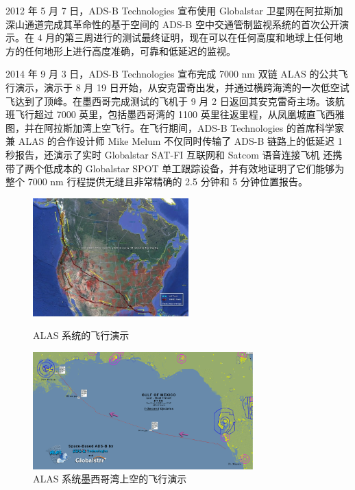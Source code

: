2012 年 5 月 7 日，ADS-B Technologies 宣布使用 Globalstar 卫星网在阿拉斯加深山通道完成其革命性的基于空间的 ADS-B 空中交通管制监视系统的首次公开演示。在 4 月的第三周进行的测试最终证明，现在可以在任何高度和地球上任何地方的任何地形上进行高度准确，可靠和低延迟的监视。

2014 年 9 月 3 日，ADS-B Technologies 宣布完成 7000 nm 双链 ALAS 的公共飞行演示，演示于 8 月 19 日开始，从安克雷奇出发，并通过横跨海湾的一次低空试飞达到了顶峰。在墨西哥完成测试的飞机于 9 月 2 日返回其安克雷奇主场。该航班飞行超过 7000 英里，包括墨西哥湾的 1100 英里往返里程，从凤凰城直飞西雅图，并在阿拉斯加湾上空飞行。在飞行期间，ADS-B Technologies 的首席科学家兼 ALAS 的合作设计师 Mike Melum 不仅同时传输了 ADS-B 链路上的低延迟 1 秒报告，还演示了实时 Globalstar SAT-FI 互联网和 Satcom 语音连接飞机 还携带了两个低成本的 Globalstar SPOT 单工跟踪设备，并有效地证明了它们能够为整个 7000 nm 行程提供无缝且非常精确的 2.5 分钟和 5 分钟位置报告。

\begin{figure}[!htb]
\centering
\begin{minipage}[t]{0.42\textwidth}
\centering
\includegraphics[width=6cm]{pic/311182-2.jpg}
\caption{ALAS 系统的飞行演示\protect\footnotemark}
\label{fig:311182-2}
\end{minipage}
\begin{minipage}[t]{0.56\textwidth}
\centering
\includegraphics[width=8.5cm]{pic/GOM-L.png}
\caption{ALAS 系统墨西哥湾上空的飞行演示\protect\footnotemark}
\label{fig:GOM-L}
\end{minipage}
\end{figure}


